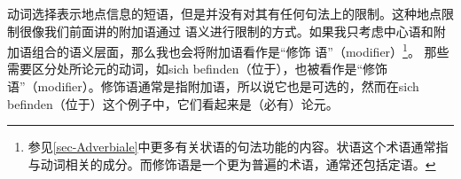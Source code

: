 %
%

动词选择表示地点信息的短语，但是并没有对其有任何句法上的限制。这种地点限制很像我们前面讲的附加语通过
语义进行限制的方式。如果我只考虑中心语和附加语组合的语义层面，那么我也会将附加语看作是“修饰
语”（modifier）\footnote{%
参见\ref{sec-Adverbiale}中更多有关状语的句法功能的内容。状语这个术语通常指与动词相关的成分。而修饰语是一个更为普遍的术语，通常还包括定语。}。
那些需要区分处所论元的动词，如sich befinden（位于），也被看作是“修饰语”（modifier）。修饰语通常是指附加语，所以说它也是可选的，然而在sich befinden（位于）这个例子中，它们看起来是（必有）论元。

